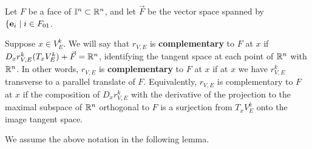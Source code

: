\begin{comment}
While we will need this map to all of $\interval^n$, we will also consider the interior $\E$ of $E$.
Over $\E$, we can identify $r_V^{-1}(\E)$ with the pullback $V \times_M \E \to \E$, and again compose with the diffeomorphism to the standard cube.
We also write this further restricted map $r_V^*$.
\end{comment}

Let $F$ be a face of $\mathbb{I}^n \subset \mathbb{R}^n$, and let $\vec F$ be the vector space spanned by $\{\mathbf{e}_i \mid i \in F_{01}$.

Suppose $x \in V_{E}^k$.
We will say that $r_{V,E}$ is \textbf{complementary} to $F$ at $x$ if $D_xr_{V,E}^k(T_xV_E^k) + \vec F = \mathbb{R}^n$, identifying the tangent space at each point of $\mathbb{R}^n$ with $\mathbb{R}^n$.
In other words, $r_{V,E}$ is \textbf{complementary} to $F$ at $x$ if at $x$ we have $r^k_{V,E}$ transverse to a parallel translate of $F$.
Equivalently, $r_{V,E}$ is complementary to $F$ at $x$ if the composition of $D_xr_{V,E}^k$ with the derivative of the projection to the maximal subspace of $\mathbb{R}^n$ orthogonal to $F$ is a surjection from $T_xV_E^k$ onto the image tangent space.

We assume the above notation in the following lemma.

